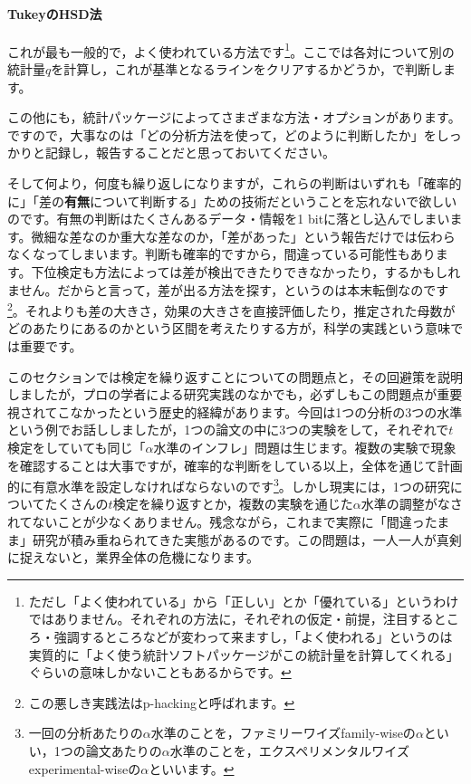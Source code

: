 \documentclass{ltjsarticle}
\begin{document}
\paragraph{TukeyのHSD法}これが最も一般的で，よく使われている方法です\footnote{ただし「よく使われている」から「正しい」とか「優れている」というわけではありません。それぞれの方法に，それぞれの仮定・前提，注目するところ・強調するところなどが変わって来ますし，「よく使われる」というのは実質的に「よく使う統計ソフトパッケージがこの統計量を計算してくれる」ぐらいの意味しかないこともあるからです。}。ここでは各対について別の統計量$q$を計算し，これが基準となるラインをクリアするかどうか，で判断します。

この他にも，統計パッケージによってさまざまな方法・オプションがあります。ですので，大事なのは「どの分析方法を使って，どのように判断したか」をしっかりと記録し，報告することだと思っておいてください。

そして何より，何度も繰り返しになりますが，これらの判断はいずれも「確率的に」「差の\textbf{有無}について判断する」ための技術だということを忘れないで欲しいのです。有無の判断はたくさんあるデータ・情報を1 bitに落とし込んでしまいます。微細な差なのか重大な差なのか，「差があった」という報告だけでは伝わらなくなってしまいます。判断も確率的ですから，間違っている可能性もあります。下位検定も方法によっては差が検出できたりできなかったり，するかもしれません。だからと言って，差が出る方法を探す，というのは本末転倒なのです\footnote{この悪しき実践法はp-hackingと呼ばれます。}。それよりも差の大きさ，効果の大きさを直接評価したり，推定された母数がどのあたりにあるのかという区間を考えたりする方が，科学の実践という意味では重要です。

このセクションでは検定を繰り返すことについての問題点と，その回避策を説明しましたが，プロの学者による研究実践のなかでも，必ずしもこの問題点が重要視されてこなかったという歴史的経緯があります。今回は1つの分析の3つの水準という例でお話ししましたが，1つの論文の中に3つの実験をして，それぞれで$t$検定をしていても同じ「$\alpha$水準のインフレ」問題は生じます。複数の実験で現象を確認することは大事ですが，確率的な判断をしている以上，全体を通じて計画的に有意水準を設定しなければならないのです\footnote{一回の分析あたりの$\alpha$水準のことを，ファミリーワイズfamily-wiseの$\alpha$といい，1つの論文あたりの$\alpha$水準のことを，エクスペリメンタルワイズexperimental-wiseの$\alpha$といいます。}。しかし現実には，1つの研究についてたくさんの$t$検定を繰り返すとか，複数の実験を通じた$\alpha$水準の調整がなされてないことが少なくありません。残念ながら，これまで実際に「間違ったまま」研究が積み重ねられてきた実態があるのです。この問題は，一人一人が真剣に捉えないと，業界全体の危機になります。
\end{document}

